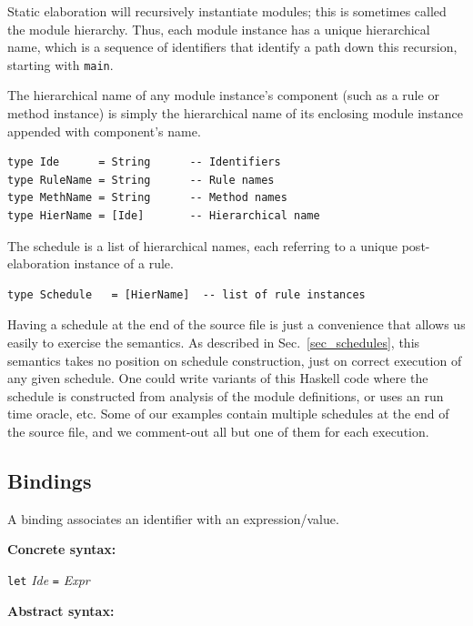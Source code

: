 \documentclass[11pt]{article}
\newcommand{\hm}{\hspace*{1em}}
\newcommand{\nterm}[1]{\emph{#1}}
\newcommand{\term}[1]{\texttt{#1}}
\newcommand{\gram}[2]{    \hm\makebox[10em][l]{\it #1}\makebox[1.5em][l]{::=}    #2}
\begin{document}
Static elaboration will recursively instantiate modules; this is
sometimes called the module hierarchy.  Thus, each module instance has
a unique hierarchical name, which is a sequence of identifiers that
identify a path down this recursion, starting with \term{main}.

The hierarchical name of any module instance's component (such as a
rule or method instance) is simply the hierarchical name of its
enclosing module instance appended with component's name.

\begin{Verbatim}[frame=single, commandchars=\\\{\}]
type Ide      = String      -- Identifiers
type RuleName = String      -- Rule names
type MethName = String      -- Method names
type HierName = [Ide]       -- Hierarchical name
\end{Verbatim}

The schedule is a list of hierarchical names, each referring to a
unique post-elaboration instance of a rule.

\begin{Verbatim}[frame=single, commandchars=\\\{\}]
type Schedule   = [HierName]  -- list of rule instances
\end{Verbatim}

Having a schedule at the end of the source file is just a convenience
that allows us easily to exercise the semantics.  As described in
Sec.~\ref{sec_schedules}, this semantics takes no position on schedule
construction, just on correct execution of any given schedule.  One
could write variants of this Haskell code where the schedule is
constructed from analysis of the module definitions, or uses an run
time oracle, etc.  Some of our examples contain multiple schedules at
the end of the source file, and we comment-out all but one of them for
each execution.


\subsection{Bindings}

A binding associates an identifier with an expression/value.

{\bf Concrete syntax:}

\gram{Binding}{\term{let}  \nterm{Ide} \term{=}  \nterm{Expr}}

{\bf Abstract syntax:}
\end{document}
